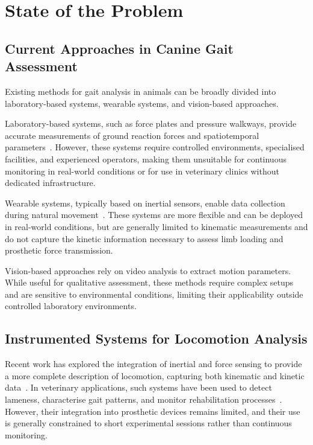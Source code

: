 \chapter{State of the Problem}

\section{Current Approaches in Canine Gait Assessment}

Existing methods for gait analysis in animals can be broadly divided into
laboratory-based systems, wearable systems, and vision-based approaches.

Laboratory-based systems, such as force plates and pressure walkways, provide
accurate measurements of ground reaction forces and spatiotemporal
parameters~\cite{McLaughlin2001,Oosterlinck2011,Fahie2018}.
However, these systems require controlled environments, specialised facilities,
and experienced operators, making them unsuitable for continuous monitoring in
real-world conditions or for use in veterinary clinics without dedicated
infrastructure.

Wearable systems, typically based on inertial sensors, enable data collection
during natural movement~\cite{Jenkins2018,Ladha2017,Zhang2022,Hayati2019}.
These systems are more flexible and can be deployed in real-world conditions,
but are generally limited to kinematic measurements and do not capture the
kinetic information necessary to assess limb loading and prosthetic force
transmission.

Vision-based approaches rely on video analysis to extract motion parameters.
While useful for qualitative assessment, these methods require complex setups
and are sensitive to environmental conditions, limiting their applicability
outside controlled laboratory environments.

\section{Instrumented Systems for Locomotion Analysis}

Recent work has explored the integration of inertial and force sensing to
provide a more complete description of locomotion, capturing both kinematic and
kinetic data~\cite{Zhang2022}.
In veterinary applications, such systems have been used to detect lameness,
characterise gait patterns, and monitor rehabilitation
processes~\cite{Fahie2018,Blattler2024}.
However, their integration into prosthetic devices remains limited, and their
use is generally constrained to short experimental sessions rather than
continuous monitoring.


